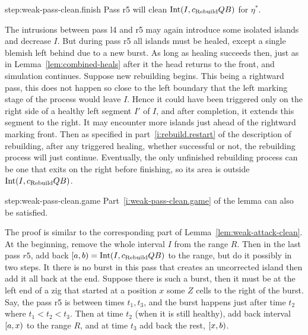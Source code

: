 \documentclass[11pt]{memoir}
\theoremstyle{definition} %
\def\B{B}
\newcommand{\Int}{\mathrm{Int}} %
\newcommand{\Q}{Q} %
\newcommand{\Rg}{R} %
\newcommand{\Z}{Z} %
\newcommand{\cns}[1]{c_{\textrm{\upshape #1}}}
\newcommand{\CRebuild}{\cns{Rebuild}}
\begin{document}
\begin{Proof}
\begin{step+}{step:weak-pass-clean.finish}
  Pass r5 will clean \( \Int(I, \CRebuild\Q\B) \) for \( \eta^{*} \).
\end{step+}
\begin{pproof}
  The intrusions between pass l4 and r5 may again introduce some isolated islands and decrease
  \( I \).
  But during pass r5 all islands must be healed, except a single blemish left behind due to a new burst.
  As long as healing succeeds then, just as in Lemma~\ref{lem:combined-heals}
  after it the head returns to the front, and simulation continues.
  Suppose new rebuilding begins.
  This being a rightward pass, this does not happen
  so close to the left boundary that the left marking stage of the process would
  leave \( I \).
  Hence it could have been triggered only on the right side of a healthy left segment \( I' \) of \( I \),
  and after completion, it extends this segment to the right.
  It may encounter more islands just ahead of the rightward marking front.
  Then as specified in part~\eqref{i:rebuild.restart} of the description of rebuilding, after
  any triggered healing, whether successful or not, the rebuilding process will just continue.
  Eventually, the only unfinished rebuilding process can be one that exits on the right before
  finishing, so its area is outside \( \Int(I,\CRebuild\Q\B) \).
\end{pproof} %

\begin{step+}{step:weak-pass-clean.game}
  Part~\eqref{i:weak-pass-clean.game} of the lemma can also be satisfied.
\end{step+}
\begin{prooof}
  The proof is similar to the corresponding part of Lemma~\ref{lem:weak-attack-clean}.
  At the beginning, remove the whole interval \( I \) from the range \( \Rg \).
  Then in the last pass \( r5 \), add back \( \lint{a}{b}=\Int(I,\CRebuild\Q\B) \) to the range, but
  do it possibly in two steps.
  It there is no burst in this pass that creates an uncorrected island then add it all back at the end.
  Suppose there is such a burst, then it must be at the left end of a zig that started at a position
  \( x \) some \( \Z \) cells to the right of the burst.
  Say, the pass r5 is between times \( t_{1},t_{3} \), and the burst happens just after time \( t_{2} \)
  where \( t_{1}<t_{2}<t_{3} \).  
  Then at time \( t_{2} \) (when it is still healthy),
  add back interval \( \left[a,x\right) \) to the range \( \Rg \),
  and at time \( t_{3} \) add back the rest, \( \left[x,b\right) \).
\end{prooof} %
\end{Proof}
\end{document}
